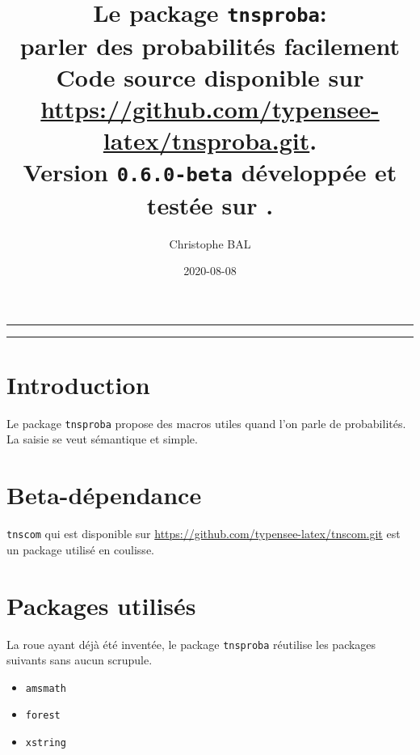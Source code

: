 \documentclass[12pt,a4paper]{article}
\theoremstyle{definition}
\begin{document}
\renewcommand\labelitemi{\raisebox{0.125em}{\tiny\textbullet}}
\renewcommand{\labelitemii}{---}

\title{  %
	Le package \texttt{tnsproba}:\\%
	parler des probabilités facilement\\%
	{\footnotesize Code source disponible sur \url{https://github.com/typensee-latex/tnsproba.git}.}\\%
{\footnotesize Version \texttt{0.6.0-beta} développée et testée sur \macosxname{}.}%
}
\author{Christophe BAL}
\date{2020-08-08}

\maketitle


\vspace{2em}

\hrule

\tableofcontents

\vspace{1.5em}

\hrule

\newpage

\section{Introduction}

Le package \verb+tnsproba+ propose des macros utiles quand l'on parle de probabilités. La saisie se veut sémantique et simple.


\section{Beta-dépendance}

\verb#tnscom# qui est disponible sur \url{https://github.com/typensee-latex/tnscom.git} est un package utilisé en coulisse.
\section{Packages utilisés}

La roue ayant déjà été inventée, le package \verb#tnsproba# réutilise les packages suivants sans aucun scrupule.

\begin{multicols}{4}
    \begin{itemize}
        \item \verb#amsmath#
        \item \verb#forest#
        \item \verb#xstring#
    \end{itemize}
\end{multicols}
\end{document}
